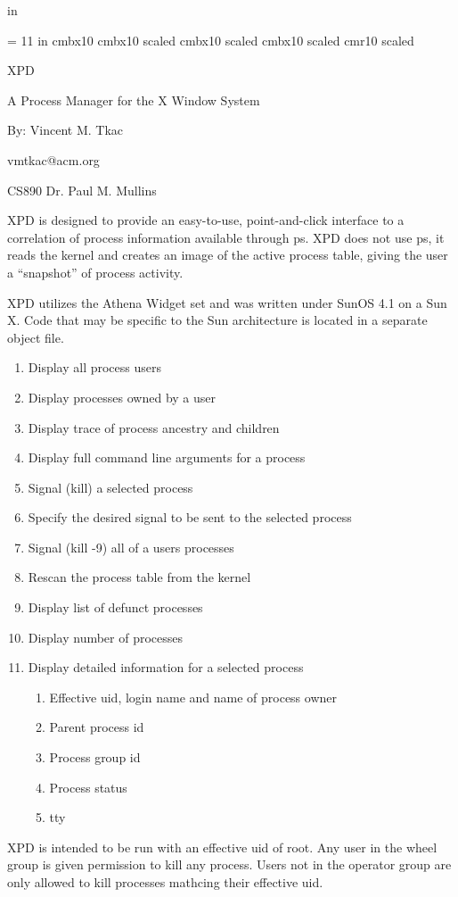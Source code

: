  in
\pagestyle{empty}

\vsize = 11 in
\font\bold cmbx10
\font\bigbold cmbx10 scaled 
\font\biggbold cmbx10 scaled 
\font\bigggbold cmbx10 scaled 
\font\reg cmr10 scaled 

\centerline{\bigggbold XPD}
\bigskip
\centerline{\biggbold A Process Manager for the X Window System}
\medskip
\centerline{\bigbold By:  Vincent M. Tkac}
\centerline{\bold vmtkac@acm.org}
\bigskip
{\bold CS890 \hfill Dr. Paul M. Mullins}
\bigskip\bigskip

\medskip

XPD is designed to provide an easy-to-use, point-and-click interface to a correlation of process information available through {\bold ps}.
XPD does not use {\bold ps}, it reads the kernel and creates an image of the active process table, giving the user a ``snapshot'' of process activity.

XPD utilizes the Athena Widget set and was written under SunOS 4.1 on a Sun X.
Code that may be specific to the Sun architecture is located in a separate object file.

\medskip
\bigskip
{}
\begin{enumerate}
\item{Display all process users}
\item{Display processes owned by a user}
\item{Display trace of process ancestry and children}
\item{Display full command line arguments for a process}
\item{Signal (kill) a selected process}
\item{Specify the desired signal to be sent to the selected process}
\item{Signal (kill -9) all of a users processes}
\item{Rescan the process table from the kernel}
\item{Display list of defunct processes}
\item{Display number of processes}
\item{Display detailed information for a selected process}
\begin{enumerate}
\item{Effective uid, login name and name of process owner}
\item{Parent process id}
\item{Process group id}
\item{Process status}
\item{tty}
\end{enumerate}
\end{enumerate}

\medskip
{}
\medskip

XPD is intended to be run with an effective uid of root.
Any user in the {\bold wheel} group is given permission to kill any process.
Users not in the operator group are only allowed to kill processes mathcing their effective uid.


